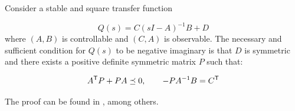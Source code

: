\documentclass[graybox, envcountchap]{svmult}
\begin{document}
\begin{lemma}\label{lem:nilem}
Consider a stable and square transfer function

\[
  Q(s)=C(sI-A)^{-1}B + D
\]
where $(A,B)$ is controllable and $(C,A)$ is observable.  The necessary and
sufficient condition for $Q(s)$ to be negative imaginary is that $D$ is
symmetric and there exists a positive definite symmetric matrix $P$ such that:

\begin{equation*}
  A^{\sf T}P+PA \preceq 0
  ,\qquad
  -PA^{-1}B = C^{\sf T}
\end{equation*}
\end{lemma}

The proof can be found in \cite[Lemma 7]{xiong2010negative}, among others.
\end{document}
